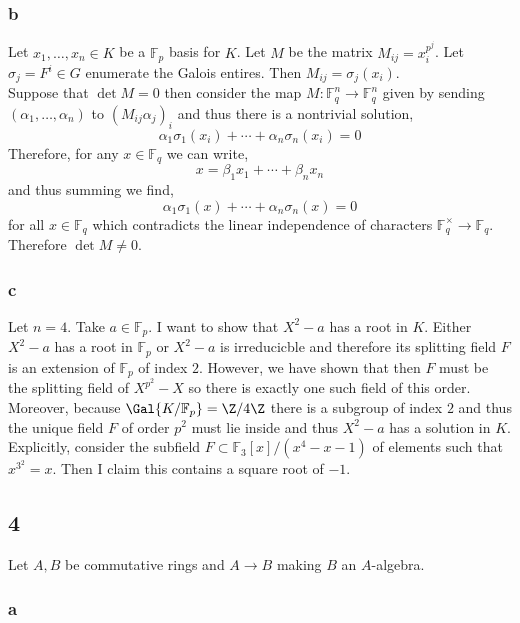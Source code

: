 \documentclass[12pt]{article}
\renewcommand{\F}{\mathbb{F}}
\begin{document}
\subsubsection{b}

Let $x_1, \dots, x_n \in K$ be a $\F_p$ basis for $K$. Let $M$ be the matrix $M_{ij} = x_i^{p^j}$. Let $\sigma_j = F^i \in G$ enumerate the Galois entires. Then $M_{ij} = \sigma_j(x_i)$.  
\bigskip\\
Suppose that $\det{M} = 0$ then consider the map $M : \F_q^n \to \F_q^n$ given by sending $(\alpha_1, \dots, \alpha_n)$ to $(M_{ij} \alpha_j)_i$ and thus there is a nontrivial solution,
\[ \alpha_{1} \sigma_1(x_i) + \cdots + \alpha_{n} \sigma_n(x_i) = 0  \]
Therefore, for any $x \in \F_q$ we can write,
\[ x = \beta_1 x_1 + \cdots + \beta_n x_n \]
and thus summing we find,
\[ \alpha_1 \sigma_1(x) + \cdots + \alpha_n \sigma_n(x) = 0 \]
for all $x \in \F_q$ which contradicts the linear independence of characters $\F_q^\times \to \F_q$. Therefore $\det{M} \neq 0$.

\subsubsection{c}

Let $n = 4$. Take $a \in \F_p$. I want to show that $X^2 - a$ has a root in $K$. Either $X^2 - a$ has a root in $\F_p$ or $X^2 - a$ is irreducicble and therefore its splitting field $F$ is an extension of $\F_p$ of index $2$. However, we have shown that then $F$ must be the splitting field of $X^{p^2} - X$ so there is exactly one such field of this order. Moreover, because $\Gal{K/\F_p} = \Z / 4 \Z$ there is a subgroup of index $2$ and thus the unique field $F$ of order $p^2$ must lie inside and thus $X^2 - a$ has a solution in $K$.
\bigskip\\
Explicitly, consider the subfield $F \subset \mathbb{F}_3[x]/(x^4 - x - 1)$ of elements such that $x^{3^2} = x$. Then I claim this contains a square root of $-1$.

\subsection{4}

Let $A, B$ be commutative rings and $A \to B$ making $B$ an $A$-algebra.

\subsubsection{a}
\end{document}
